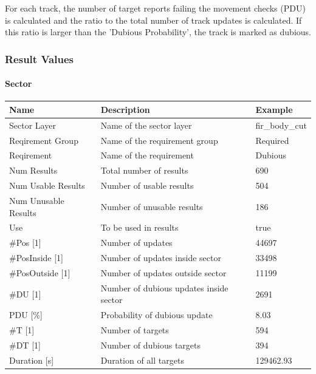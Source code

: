 For each track, the number of target reports failing the movement checks (PDU) is calculated and the ratio to the total number of track updates is calculated. If this ratio is larger than the 'Dubious Probability', the track is marked as dubious.

\subsubsection{Result Values}

\paragraph{Sector}

\begin{center}
 \begin{table}[H]
  \begin{tabularx}{\textwidth}{ | l | X |  l | }
    \hline
    \textbf{Name} & \textbf{Description} & \textbf{Example} \\ \hline
    Sector Layer & Name of the sector layer & fir\_body\_cut \\ \hline
    Reqirement Group & Name of the requirement group & Required \\ \hline
    Reqirement & Name of the requirement & Dubious \\ \hline
    Num Results & Total number of results & 690 \\ \hline
    Num Usable Results & Number of usable results & 504 \\ \hline
    Num Unusable Results & Number of unusable results & 186 \\ \hline
    Use & To be used in results & true \\ \hline
    \#Pos [1] & Number of updates & 44697 \\ \hline
    \#PosInside [1] & Number of updates inside sector & 33498 \\ \hline
    \#PosOutside [1] & Number of updates outside sector & 11199 \\ \hline
    \#DU [1] & Number of dubious updates inside sector & 2691 \\ \hline
    PDU [\%] & Probability of dubious update & 8.03 \\ \hline
    \#T [1] & Number of targets & 594 \\ \hline
    \#DT [1] & Number of dubious targets & 394 \\ \hline
    Duration [s] & Duration of all targets & 129462.93 \\ \hline

\end{tabularx}
\end{table}
\end{center}
